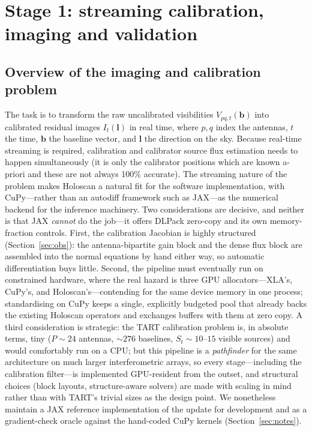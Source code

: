 \documentclass[11pt]{article}
\begin{document}
\section{Stage 1: streaming calibration, imaging and validation}
\label{sec:stage1}

\subsection{Overview of the imaging and calibration problem}

The task is to transform the raw uncalibrated visibilities $V_{pq,t}(\bm{b})$ into calibrated residual images $I_{t}(\bm{l})$ in real time, where $p,q$ index the antennas, $t$ the time, $\bm{b}$ the baseline vector, and $\bm{l}$ the direction on the sky. Because real-time streaming is required, calibration and calibrator source flux estimation needs to happen simultaneously (it is only the calibrator positions which are known a-priori and these are not always 100\% accurate). The streaming nature of the problem makes Holoscan a natural fit for the software implementation, with CuPy---rather than an autodiff framework such as JAX---as the numerical backend for the inference machinery. Two considerations are decisive, and neither is that JAX \emph{cannot} do the job---it offers DLPack zero-copy and its own memory-fraction controls. First, the calibration Jacobian is highly structured (Section~\ref{sec:obs}): the antenna-bipartite gain block and the dense flux block are assembled into the normal equations by hand either way, so automatic differentiation buys little. Second, the pipeline must eventually run on constrained hardware, where the real hazard is three GPU allocators---XLA's, CuPy's, and Holoscan's---contending for the same device memory in one process; standardising on CuPy keeps a single, explicitly budgeted pool that already backs the existing Holoscan operators and exchanges buffers with them at zero copy. A third consideration is strategic: the TART calibration problem is, in absolute terms, tiny ($P\sim24$ antennas, $\sim\!276$ baselines, $S_t\sim10$--$15$ visible sources) and would comfortably run on a CPU; but this pipeline is a \emph{pathfinder} for the same architecture on much larger interferometric arrays, so every stage---including the calibration filter---is implemented GPU-resident from the outset, and structural choices (block layouts, structure-aware solvers) are made with scaling in mind rather than with TART's trivial sizes as the design point. We nonetheless maintain a JAX reference implementation of the update for development and as a gradient-check oracle against the hand-coded CuPy kernels (Section~\ref{sec:notes}).
\end{document}
